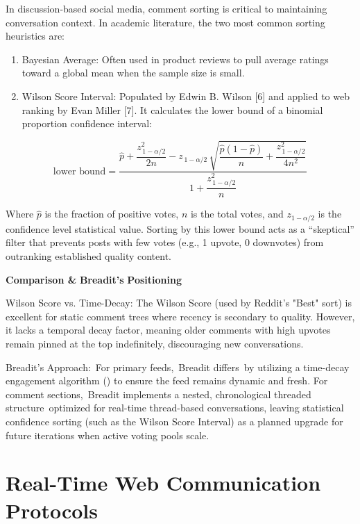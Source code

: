 In discussion-based social media, comment sorting is critical to maintaining conversation context. In academic literature, the two most common sorting heuristics are:
\begin{enumerate}
  \item Bayesian Average: Often used in product reviews to pull average ratings toward a global mean when the sample size is small.
  \item Wilson Score Interval: Populated by Edwin B. Wilson [6] and applied to web ranking by Evan Miller [7]. It calculates the lower bound of a binomial proportion confidence interval:
\end{enumerate}
\[
  \text{lower bound} =
  \frac{
    \hat{p}
    + \dfrac{z_{\,1-\alpha/2}^{2}}{2n}
    - z_{\,1-\alpha/2}\,\sqrt{\dfrac{\hat{p}(1-\hat{p})}{n}
      + \dfrac{z_{\,1-\alpha/2}^{2}}{4n^{2}}}
  }{
    1 + \dfrac{z_{\,1-\alpha/2}^{2}}{n}
  }
\]

Where $\hat{p}$ is the fraction of positive votes, $n$ is the total votes, and $z_{1-\alpha/2}$ is the confidence level statistical value. Sorting by this lower bound acts as a ``skeptical'' filter that prevents posts with few votes (e.g., 1 upvote, 0 downvotes) from outranking established quality content.

\textbf{Comparison \& }\textbf{Breadit's}\textbf{ Positioning}

Wilson Score vs. Time-Decay: The Wilson Score (used by Reddit's "Best" sort) is excellent for static comment trees where recency is secondary to quality. However, it lacks a temporal decay factor, meaning older comments with high upvotes remain pinned at the top indefinitely, discouraging new conversations.

Breadit's Approach:~For primary feeds,~Breadit differs~by utilizing a time-decay engagement algorithm () to ensure the feed remains dynamic and fresh. For comment sections,~Breadit implements a nested, chronological threaded structure~optimized for real-time thread-based conversations, leaving statistical confidence sorting (such as the Wilson Score Interval) as a planned upgrade for future iterations when active voting pools scale.

\section{Real-Time Web Communication Protocols}

